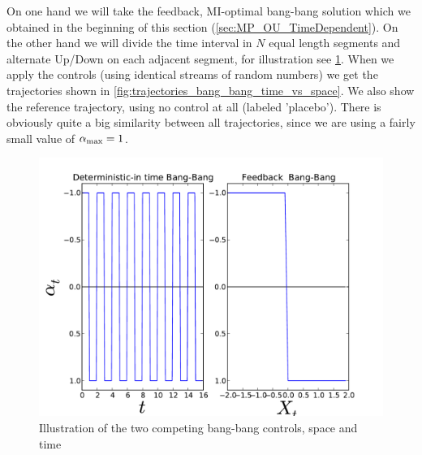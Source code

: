 \documentclass{article}
\begin{document}
On one hand we will take the feedback, MI-optimal bang-bang solution which we
obtained in the beginning of this section (\cref{sec:MP_OU_TimeDependent}). On
the other hand we will divide the time interval in $N$ equal length segments and
alternate Up/Down on each adjacent segment, for illustration see  
\cref{fig:bang_bang_time_vs_space}. When we apply the controls (using identical
streams of random numbers) we get the trajectories shown in
\cref{fig:trajectories_bang_bang_time_vs_space}. We also show the reference
trajectory, using no control at all (labeled 'placebo'). There is obviously
quite a big similarity between all trajectories, since we are using a fairly 
small value of ${ {\alpha}_{\textrm{max}} }= 1$.

\begin{figure}[htp]
\begin{center}
  \includegraphics[width=1\textwidth]{Figs/OU_MIControlSimulator/Fb_vs_det_control_illustrate.pdf}
  \caption[labelInTOC]{Illustration of the two competing bang-bang controls,
  space and time}
  \label{fig:bang_bang_time_vs_space}
\end{center}
\end{figure}
\end{document}
